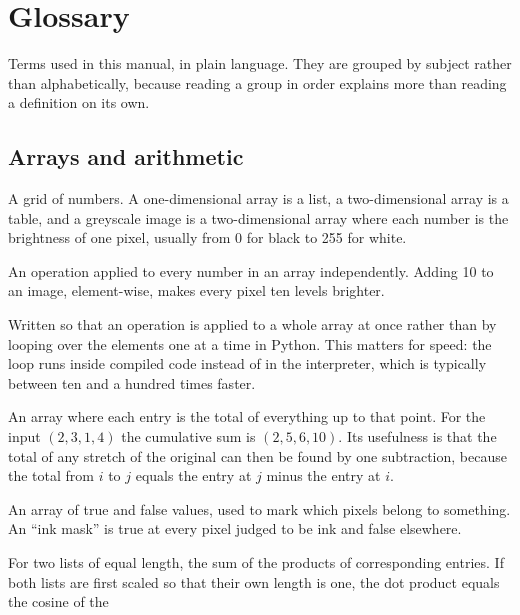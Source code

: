 \documentclass[11pt,a4paper,oneside]{report}
\begin{document}


\chapter{Glossary}

Terms used in this manual, in plain language. They are grouped by subject
rather than alphabetically, because reading a group in order explains more
than reading a definition on its own.

\section{Arrays and arithmetic}
\begin{description}[style=nextline,leftmargin=1.4em]
  \item[Array] A grid of numbers. A one-dimensional array is a list, a
        two-dimensional array is a table, and a greyscale image is a
        two-dimensional array where each number is the brightness of one
        pixel, usually from 0 for black to 255 for white.
  \item[Element-wise] An operation applied to every number in an array
        independently. Adding 10 to an image, element-wise, makes every pixel
        ten levels brighter.
  \item[Vectorised] Written so that an operation is applied to a whole array
        at once rather than by looping over the elements one at a time in
        Python. This matters for speed: the loop runs inside compiled code
        instead of in the interpreter, which is typically between ten and a
        hundred times faster.
  \item[Cumulative sum, or prefix sum] An array where each entry is the total
        of everything up to that point. For the input $(2, 3, 1, 4)$ the
        cumulative sum is $(2, 5, 6, 10)$. Its usefulness is that the total
        of any stretch of the original can then be found by one subtraction,
        because the total from $i$ to $j$ equals the entry at $j$ minus the
        entry at $i$.
  \item[Mask] An array of true and false values, used to mark which pixels
        belong to something. An ``ink mask'' is true at every pixel judged to
        be ink and false elsewhere.
  \item[Dot product] For two lists of equal length, the sum of the products
        of corresponding entries. If both lists are first scaled so that
        their own length is one, the dot product equals the cosine of the

\end{description}
\end{document}
